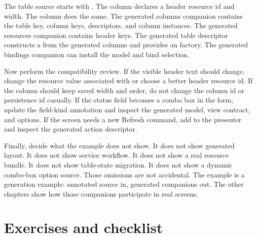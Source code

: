 The table source starts with .
The  column declares a header resource id and width. The
 column does the same. The generated columns companion contains
the table key, column keys, descriptors, and column instances. The generated
resources companion contains header keys. The generated table descriptor
constructs a  from the generated columns and provides an
 factory. The generated bindings companion can
install the model and bind selection.

Now perform the compatibility review. If the visible header text should change,
change the resource value associated with  or choose a
better header resource id. If the column should keep saved width and order,
do not change the column id or persistence id casually. If the status field
becomes a combo box in the form, update the field-kind annotation and inspect
the generated model, view contract, and options. If the screen needs a new
Refresh command, add  to the presenter and inspect the
generated action descriptor.

Finally, decide what the example does not show. It does not show generated
layout. It does not show service workflow. It does not show a real resource
bundle. It does not show table-state migration. It does not show a dynamic
combo-box option source. Those omissions are not accidental. The example is a
generation example: annotated source in, generated companions out. The other
chapters show how those companions participate in real screens.

\section{Exercises and checklist}

